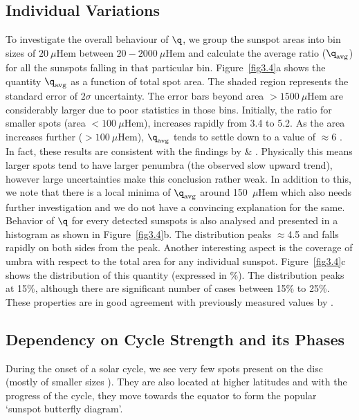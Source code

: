 \subsection{Individual Variations}

To investigate the overall behaviour of  $\q$, we group the sunspot areas into bin sizes of $20~\mu$Hem between $20-2000~\mu$Hem and calculate the average ratio ({$\q_{\rm avg}$}) for all the sunspots falling in that particular bin. Figure~\ref{fig3.4}a shows the quantity {$ \q_{\rm avg}$} as a function of total spot area. The shaded region represents the standard error of $2\sigma$ uncertainty. The error bars beyond area $>1500~\mu$Hem are considerably larger due to poor statistics in those bins. Initially, the ratio for smaller spots (area $<100~\mu$Hem), increases rapidly from 3.4 to 5.2. As the area increases further ($>100~\mu$Hem), {$ \q_{\rm avg}$} tends to settle down to a value of $\approx$6 \citep{Jha2018}. In fact, these results are consistent with the findings by \cite{Antalova1971} \& \cite{Hathaway2013}. Physically this means larger spots tend to have larger penumbra (the observed slow upward trend), however large uncertainties make this conclusion rather weak. In addition to this, we note that there is a local minima of {$\q_{\rm avg}$} around 150~$\mu$Hem which also needs further investigation and we do not have a convincing explanation for the same. Behavior of $\q$ for every detected sunspots is also analysed and presented in a histogram as shown in Figure~\ref{fig3.4}b. The distribution peaks $\approx$4.5 and falls rapidly on both sides from the peak. Another interesting aspect is the coverage of umbra with respect to the total area for any individual sunspot. Figure~\ref{fig3.4}c shows the distribution of this quantity (expressed in \%). The distribution peaks at 15\%, although there are significant number of cases between 15\% to 25\%. These properties are in good  agreement with previously measured values by \cite{Watson2011,Carrasco2018}.


\subsection{Dependency on Cycle Strength and its Phases}
During the onset of a solar cycle, we see very few spots present on the disc (mostly of smaller sizes \cite{Mandal2017a}). They are also located at higher latitudes and with the progress of the cycle, they move towards the equator to form the popular `sunspot butterfly diagram'. 

